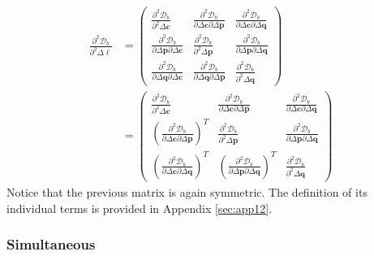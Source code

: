 \begin{equation}
    \begin{aligned}
		\frac{\partial^2 \mathcal{D}_b}{\partial^2 \Delta \boldsymbol{\ell}} & =
		\begin{pmatrix}
			\frac{\partial^2 \mathcal{D}_b}{\partial^2 \Delta \mathbf{c}} & \frac{\partial^2 \mathcal{D}_b}{\partial \Delta \mathbf{c} \partial \Delta \mathbf{p}} & \frac{\partial^2 \mathcal{D}_b}{\partial \Delta \mathbf{c} \partial \Delta \mathbf{q}}
			\\
			\frac{\partial^2 \mathcal{D}_b}{\partial \Delta \mathbf{p} \partial \Delta \mathbf{c}} & \frac{\partial^2 \mathcal{D}_b}{\partial^2 \Delta \mathbf{p}} & \frac{\partial^2 \mathcal{D}_b}{\partial \Delta \mathbf{p} \partial \Delta \mathbf{q}}
			\\
			\frac{\partial^2 \mathcal{D}_b}{\partial \Delta \mathbf{q} \partial \Delta \mathbf{c}} & \frac{\partial^2 \mathcal{D}_b}{\partial \Delta \mathbf{q} \partial \Delta \mathbf{p}}
			& \frac{\partial^2 \mathcal{D}_b}{\partial^2 \Delta \mathbf{q}}    
		\end{pmatrix}
        \\
        & =
        \begin{pmatrix}
            \frac{\partial^2 \mathcal{D}_b}{\partial^2 \Delta \mathbf{c}} & \frac{\partial^2 \mathcal{D}_b}{\partial \Delta \mathbf{c} \partial \Delta \mathbf{p}} & \frac{\partial^2 \mathcal{D}_b}{\partial \Delta \mathbf{c} \partial \Delta \mathbf{q}}
            \\
            \left(\frac{\partial^2 \mathcal{D}_b}{\partial \Delta \mathbf{c} \partial \Delta \mathbf{p}}\right)^T & \frac{\partial^2 \mathcal{D}_b}{\partial^2 \Delta \mathbf{p}} & \frac{\partial^2 \mathcal{D}_b}{\partial \Delta \mathbf{p} \partial \Delta \mathbf{q}}
            \\
            \left(\frac{\partial^2 \mathcal{D}_b}{\partial \Delta \mathbf{c} \partial \Delta \mathbf{q}}\right)^T & \left(\frac{\partial^2 \mathcal{D}_b}{\partial \Delta \mathbf{p} \partial \Delta \mathbf{q}}\right)^T
            & \frac{\partial^2 \mathcal{D}_b}{\partial^2 \Delta \mathbf{q}}
        \end{pmatrix}
    \label{eq:bidirectional_newton_hessian}
    \end{aligned}
\end{equation}
Notice that the previous matrix is again symmetric. The definition of its individual terms is provided in Appendix \ref{sec:app12}.


\subsubsection*{Simultaneous}
\label{sec:newton_simultaneous}

